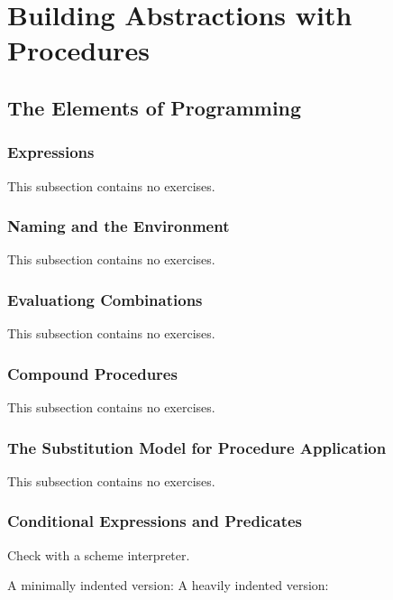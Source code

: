 \chapter{Building Abstractions with Procedures}

\section{The Elements of Programming}

\subsection{Expressions}

This subsection contains no exercises.

\subsection{Naming and the Environment}

This subsection contains no exercises.

\subsection{Evaluationg Combinations}

This subsection contains no exercises.

\subsection{Compound Procedures}

This subsection contains no exercises.

\subsection{The Substitution Model for Procedure Application}

This subsection contains no exercises.

\subsection{Conditional Expressions and Predicates}

\begin{exe}[1.1]
    Check with a scheme interpreter.
\end{exe}

\begin{exe}[1.2]
    A minimally indented version:
    A heavily indented version:
\end{exe}

